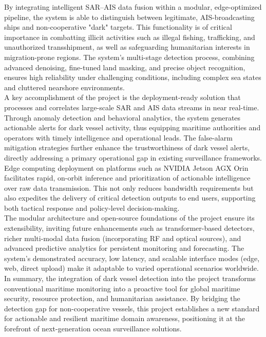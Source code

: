 \documentclass{article}
\begin{document}
	By integrating intelligent SAR–AIS data fusion within a modular, edge-optimized pipeline, the system is able to distinguish between legitimate, AIS-broadcasting ships and non-cooperative "dark" targets. This functionality is of critical importance in combatting illicit activities such as illegal fishing, trafficking, and unauthorized transshipment, as well as safeguarding humanitarian interests in migration-prone regions. The system’s multi-stage detection process, combining advanced denoising, fine-tuned land masking, and precise object recognition, ensures high reliability under challenging conditions, including complex sea states and cluttered nearshore environments.\\
	
	A key accomplishment of the project is the deployment-ready solution that processes and correlates large-scale SAR and AIS data streams in near real-time. Through anomaly detection and behavioral analytics, the system generates actionable alerts for dark vessel activity, thus equipping maritime authorities and operators with timely intelligence and operational leads. The false-alarm mitigation strategies further enhance the trustworthiness of dark vessel alerts, directly addressing a primary operational gap in existing surveillance frameworks.\\
	
	Edge computing deployment on platforms such as NVIDIA Jetson AGX Orin facilitates rapid, on-orbit inference and prioritization of actionable intelligence over raw data transmission. This not only reduces bandwidth requirements but also expedites the delivery of critical detection outputs to end users, supporting both tactical response and policy-level decision-making.\\
	
	The modular architecture and open-source foundations of the project ensure its extensibility, inviting future enhancements such as transformer-based detectors, richer multi-modal data fusion (incorporating RF and optical sources), and advanced predictive analytics for persistent monitoring and forecasting. The system’s demonstrated accuracy, low latency, and scalable interface modes (edge, web, direct upload) make it adaptable to varied operational scenarios worldwide.\\
	
	In summary, the integration of dark vessel detection into the project transforms conventional maritime monitoring into a proactive tool for global maritime security, resource protection, and humanitarian assistance. By bridging the detection gap for non-cooperative vessels, this project establishes a new standard for actionable and resilient maritime domain awareness, positioning it at the forefront of next-generation ocean surveillance solutions.
	\newpage
	
\end{document}
